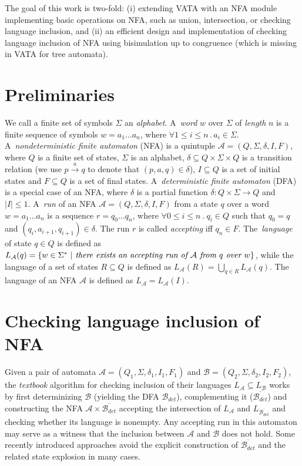 \documentclass{eeict}
\begin{document}
The goal of this work is two-fold: (i) extending VATA with an NFA module implementing basic operations on NFA, such as union, intersection, or 
checking language inclusion, and (ii) an efficient design and implementation of checking language inclusion of NFA using 
bisimulation up to congruence (which is missing in VATA for tree automata).

\section{Preliminaries}
We call a finite set of symbols $\Sigma$ an \emph{alphabet}. A~\emph{word} $w$ over $\Sigma$ of \emph{length} $n$ is a finite sequence of symbols 
$w=a_1\ldots a_n$, where $\forall 1 \leq i \leq n\,.\,a_i \in \Sigma$. 
A~\emph{nondeterministic finite automaton} (NFA) is a quintuple $\mathcal{A}= (Q,\Sigma,\delta,I,F)$, 
where $Q$ is a finite set of states, $\Sigma$ is an alphabet, $\delta \subseteq Q\times \Sigma \times Q$
is a transition relation (we use $p \xrightarrow{a} q$ to denote that $(p,a,q) \in \delta$), $I \subseteq Q$ is a set of initial states 
and $F \subseteq Q$ is a set of final states. A~\emph{deterministic finite automaton} (DFA) is a special case of an NFA, 
where $\delta$ is a partial function 
$\delta: Q\times \Sigma \to Q$ and $|I| \leq 1$. A~\emph{run} of an NFA $\mathcal{A}=(Q,\Sigma,\delta,I,F)$ from a state $q$
over a word $w=a_1\ldots a_n$ is a sequence $r = q_0 \ldots q_n$, where $\forall 0\leq i \leq n\ .\ q_i\in Q$ 
such that $q_0=q$ and $(q_i,a_{i+1},q_{i+1})\in \delta$. 
The run $r$ is called \emph{accepting} iff $q_n \in F$. The~\emph{language} of state $q \in Q$ is defined as 
$L_\mathcal{A}(q) = \{w\in \Sigma^{*}\ |\ \emph{there exists an accepting run of }\mathcal{A} 
\emph{ from }q\emph{ over }w\}$, while the language of a set of states $R\subseteq Q$ is defined as $L_{\mathcal{A}}(R)=\bigcup_{q\in R}L_{\mathcal{A}}(q)$.
The language of an NFA $\mathcal{A}$ is defined as $L_{\mathcal{A}}=L_{\mathcal{A}}(I)$.

\section{Checking language inclusion of NFA}
Given a pair of automata $\mathcal{A}=(Q_1,\Sigma,\delta_1,I_1,F_1)$ and $\mathcal{B}=(Q_2,\Sigma,\delta_2,I_2,F_2)$,
the \emph{textbook} algorithm for checking inclusion of their languages $L_\mathcal{A}\subseteq L_\mathcal{B}$ works by first 
determinizing $\mathcal{B}$ (yielding the DFA 
$\mathcal{B}_{det}$), 
complementing it ($\overline{\mathcal{B}_{det}}$) and constructing the NFA $\mathcal{A} \times \overline{\mathcal{B}_{det}}$ 
accepting the intersection of $L_{\mathcal{A}}$ and ${L_{\overline{\mathcal{B}_{det}}}}$ and
checking whether its language is nonempty. Any accepting run in this automaton may serve as a witness that the inclusion between $\mathcal{A}$ 
and $\mathcal{B}$ does not hold. 
Some recently introduced approaches avoid the explicit construction of $\overline{\mathcal{B}_{det}}$ and the related state explosion in many cases.
\end{document}
